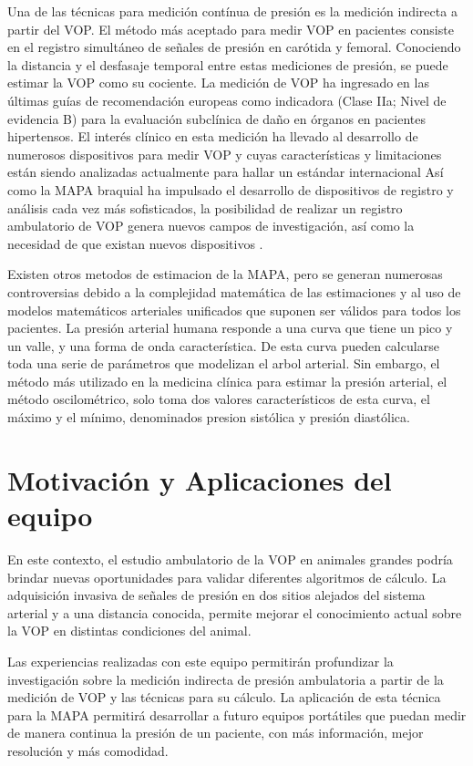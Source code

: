 Una de las técnicas para medición contínua de presión es la medición indirecta a partir del VOP. El método más aceptado para medir VOP en pacientes consiste en el registro simultáneo de señales de presión en carótida y femoral. Conociendo la distancia y el desfasaje temporal entre estas mediciones de presión, se puede estimar la VOP como su cociente. La medición de VOP ha ingresado en las últimas guías de recomendación europeas como indicadora (Clase IIa; Nivel de evidencia B) para la evaluación subclínica de daño en órganos en pacientes hipertensos. El interés clínico en esta medición ha llevado al desarrollo de numerosos dispositivos para medir VOP y cuyas características y limitaciones están siendo analizadas actualmente para hallar un estándar internacional \citep{laurent2006} Así como la MAPA braquial ha impulsado el desarrollo de dispositivos de registro y análisis cada vez más sofisticados, la posibilidad de realizar un registro ambulatorio de VOP genera nuevos campos de investigación, así como la necesidad de que existan nuevos dispositivos \citep{omboni2016}.


Existen otros metodos de estimacion de la MAPA, pero se generan numerosas controversias debido a la complejidad matemática de las estimaciones y al uso de modelos matemáticos  arteriales unificados que suponen ser válidos para todos los pacientes. 
La presión arterial humana responde a una curva que tiene un pico y un valle, y una forma de onda característica. De esta curva pueden calcularse toda una serie de parámetros que modelizan el arbol arterial. Sin embargo, el método más utilizado en la medicina clínica para estimar la presión arterial, el método oscilométrico, solo toma dos valores característicos de esta curva, el máximo y el mínimo, denominados presion sistólica y presión diastólica.

\section{Motivación y Aplicaciones del equipo}

En este contexto, el estudio ambulatorio de la VOP en animales grandes podría brindar nuevas oportunidades para validar diferentes algoritmos de cálculo. La adquisición invasiva de señales de presión en dos sitios alejados del sistema arterial y a una distancia conocida, permite mejorar el conocimiento actual sobre la VOP en distintas condiciones del animal.

Las experiencias realizadas con este equipo permitirán profundizar la investigación sobre la medición indirecta de presión ambulatoria a partir de la medición de VOP y las técnicas para su cálculo. La aplicación de esta técnica para la MAPA permitirá desarrollar a futuro equipos portátiles que puedan medir de manera continua la presión de un paciente, con más información, mejor resolución y más comodidad.


